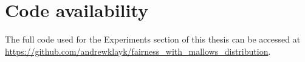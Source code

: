 \section{Code availability}\label{sect:code_availability}

The full code used for the Experiments section of this thesis can be accessed at \url{https://github.com/andrewklayk/fairness_with_mallows_distribution}.
